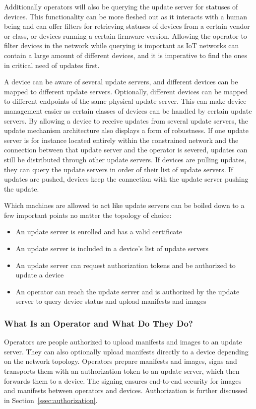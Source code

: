 \documentclass[0-thesis.tex]{subfiles}
\begin{document}
Additionally operators will also be querying the update server for statuses of devices.
This functionality can be more fleshed out as it interacts with a human being and can
offer filters for retrieving statuses of devices from a certain vendor or class, or
devices running a certain firmware version. Allowing the operator to filter devices in the
network while querying is important as IoT networks can contain a large amount of
different devices, and it is imperative to find the ones in critical need of updates
first.

A device can be aware of several update servers, and different devices can be mapped to
different update servers. Optionally, different devices can be mapped to different
endpoints of the same physical update server. This can make device management easier as
certain classes of devices can be handled by certain update servers. By allowing a device
to receive updates from several update servers, the update mechanism architecture also
displays a form of robustness. If one update server is for instance located entirely
within the constrained network and the connection between that update server and the
operator is severed, updates can still be distributed through other update servers. If
devices are pulling updates, they can query the update servers in order of their list of
update servers. If updates are pushed, devices keep the connection with the update server
pushing the update.

Which machines are allowed to act like update servers can be boiled down to a few
important points no matter the topology of choice:

\begin{itemize}
    \item An update server is enrolled and has a valid certificate
    \item An update server is included in a device's list of update servers
    \item An update server can request authorization tokens and be authorized to update a
            device
    \item An operator can reach the update server and is authorized by the update server
            to query device status and upload manifests and images
\end{itemize}

\subsubsection{What Is an Operator and What Do They Do?}
\label{sssec:what-is-an-operator}
Operators are people authorized to upload manifests and images to an update server. They
can also optionally upload manifests directly to a device depending on the network
topology. Operators prepare manifests and images, signs and transports them with an
authorization token to an update server, which then forwards them to a device. The signing
ensures end-to-end security for images and manifests between operators and devices.
Authorization is further discussed in Section~\ref{ssec:authorization}.
\end{document}
